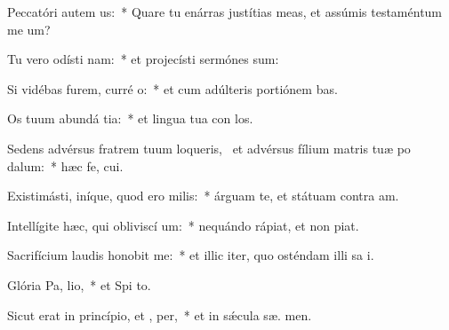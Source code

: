 \item Peccatóri autem  us:~* Quare tu enárras justítias meas, et assúmis testaméntum me   um?
\item Tu vero odísti nam:~* et projecísti sermónes  sum:
\item Si vidébas furem, curré  o:~* et cum adúlteris portiónem  bas.
\item Os tuum abundá tia:~* et lingua tua con los.
\item Sedens advérsus fratrem tuum loqueris,~\pscross{} et advérsus fílium matris tuæ po dalum:~* hæc fe,  cui.
\item Existimásti, iníque, quod ero  milis:~* árguam te, et státuam contra  am.
\item Intellígite hæc, qui obliviscí um:~* nequándo rápiat, et non   piat.
\item Sacrifícium laudis honobit me:~* et illic iter, quo osténdam illi sa i.
\item Glória Pa,  lio,~* et Spi to.
\item Sicut erat in princípio, et ,  per,~* et in sǽcula sæ. men.
